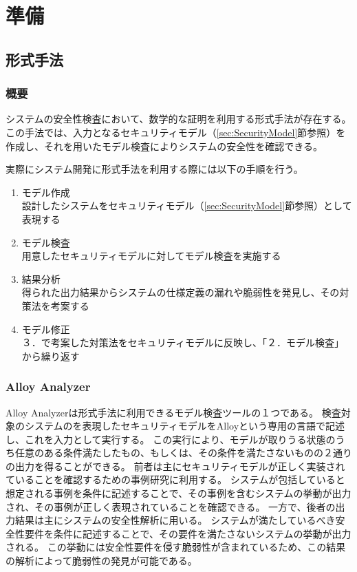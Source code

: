 \documentclass[12pt,a4paper]{jbook}
\begin{document}
\newpage

\chapter{準備}
\section{形式手法}
\subsection{概要}
システムの安全性検査において、数学的な証明を利用する形式手法が存在する。
この手法では、入力となるセキュリティモデル（\ref{sec:SecurityModel}節参照）を作成し、それを用いたモデル検査によりシステムの安全性を確認できる。

\color{red}
実際にシステム開発に形式手法を利用する際には以下の手順を行う。
\begin{enumerate}
\item モデル作成\\
設計したシステムをセキュリティモデル（\ref{sec:SecurityModel}節参照）として表現する
\item モデル検査\\
用意したセキュリティモデルに対してモデル検査を実施する
\item 結果分析\\
得られた出力結果からシステムの仕様定義の漏れや脆弱性を発見し、その対策法を考案する
\item モデル修正\\
３．で考案した対策法をセキュリティモデルに反映し、「２．モデル検査」から繰り返す
\end{enumerate}
\color{black}


\subsection{Alloy Analyzer}
Alloy Analyzerは形式手法に利用できるモデル検査ツールの１つである。
検査対象のシステムのを表現したセキュリティモデルをAlloyという専用の言語で記述し、これを入力として実行する。
\color{red}
この実行により、モデルが取りうる状態のうち任意のある条件満たしたもの、もしくは、その条件を満たさないものの２通りの出力を得ることができる。
前者は主にセキュリティモデルが正しく実装されていることを確認するための事例研究に利用する。
システムが包括していると想定される事例を条件に記述することで、その事例を含むシステムの挙動が出力され、その事例が正しく表現されていることを確認できる。
一方で、後者の出力結果は主にシステムの安全性解析に用いる。
システムが満たしているべき安全性要件を条件に記述することで、その要件を満たさないシステムの挙動が出力される。
この挙動には安全性要件を侵す脆弱性が含まれているため、この結果の解析によって脆弱性の発見が可能である。
\color{black}
\end{document}
